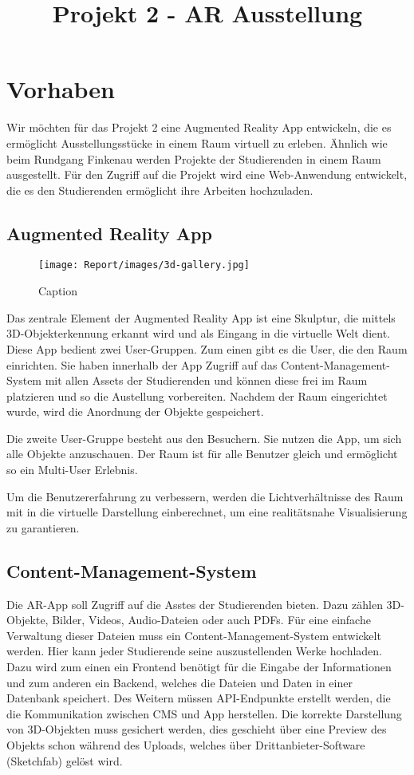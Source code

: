 \documentclass[pdftex,10pt,a4paper,oneside]{article}
\title{Projekt 2 - AR Ausstellung}
\numberwithin{equation}{section} %
\begin{document}
\maketitle

\section{Vorhaben}

Wir möchten für das Projekt 2 eine Augmented Reality App entwickeln, die es ermöglicht Ausstellungsstücke in einem Raum virtuell zu erleben. Ähnlich wie beim Rundgang Finkenau werden Projekte der Studierenden in einem Raum ausgestellt.
Für den Zugriff auf die Projekt wird eine Web-Anwendung entwickelt, die es den Studierenden ermöglicht ihre Arbeiten hochzuladen.
\subsection{Augmented Reality App}

\begin{figure}
    \centering
    \texttt{[image: Report/images/3d-gallery.jpg]}
    \caption{Caption}
    \label{fig:my_label}
\end{figure}

Das zentrale Element der Augmented Reality App ist eine Skulptur, die mittels 3D-Objekterkennung erkannt wird und als Eingang in die virtuelle Welt dient.
Diese App bedient zwei User-Gruppen. Zum einen gibt es die User, die den Raum einrichten. Sie haben innerhalb der App Zugriff auf das Content-Management-System mit allen Assets der Studierenden und können diese frei im Raum platzieren und so die Austellung vorbereiten. Nachdem der Raum eingerichtet wurde, wird die Anordnung der Objekte gespeichert.

Die zweite User-Gruppe besteht aus den Besuchern. Sie nutzen die App, um sich alle Objekte anzuschauen. Der Raum ist für alle Benutzer gleich und ermöglicht so ein Multi-User Erlebnis.

Um die Benutzererfahrung zu verbessern, werden die Lichtverhältnisse des Raum mit in die virtuelle Darstellung einberechnet, um eine realitätsnahe Visualisierung zu garantieren.

\subsection{Content-Management-System}

Die AR-App soll Zugriff auf die Asstes der Studierenden bieten. Dazu zählen 3D-Objekte, Bilder, Videos, Audio-Dateien oder auch PDFs. Für eine einfache Verwaltung dieser Dateien muss ein Content-Management-System entwickelt werden.
Hier kann jeder Studierende seine auszustellenden Werke hochladen. Dazu wird zum einen ein Frontend benötigt für die Eingabe der Informationen und zum anderen ein Backend, welches die Dateien und Daten in einer Datenbank speichert.
Des Weitern müssen API-Endpunkte erstellt werden, die die Kommunikation zwischen CMS und App herstellen.
Die korrekte Darstellung von 3D-Objekten muss gesichert werden, dies geschieht über eine Preview des Objekts schon während des Uploads, welches über Drittanbieter-Software (Sketchfab) gelöst wird.
\end{document}
